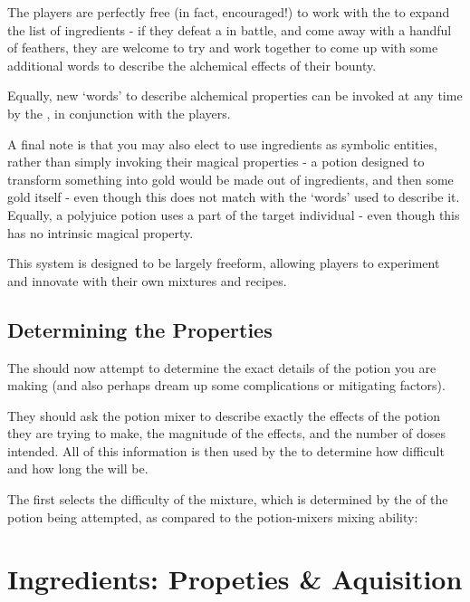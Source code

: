 The players are perfectly free (in fact, encouraged!) to work with the  to expand the list of ingredients - if they defeat a  in battle, and come away with a handful of feathers, they are welcome to try and work together to come up with some additional words to describe the alchemical effects of their bounty. 

Equally, new `words' to describe alchemical properties can be invoked at any time by the , in conjunction with the players. 

A final note is that you may also elect to use ingredients as symbolic entities, rather than simply invoking their magical properties - a potion designed to transform something into gold would be made out of  ingredients, and then some gold itself - even though this does not match with the `words' used to describe it. Equally, a polyjuice potion uses a part of the target individual - even though this has no intrinsic magical property. 

This system is designed to be largely freeform, allowing players to experiment and innovate with their own mixtures and recipes.  


\subsection{Determining the Properties}

The  should now attempt to determine the exact details of the potion you are making (and also perhaps dream up some complications or mitigating factors). 

They should ask the potion mixer to describe exactly the effects of the potion they are trying to make, the magnitude of the effects, and the number of doses intended. All of this information is then used by the  to determine how difficult and how long the  will be. 

The  first selects the difficulty of the mixture, which is determined by the  of the potion being attempted, as compared to the potion-mixers mixing ability:




\section{Ingredients: Propeties \& Aquisition}
